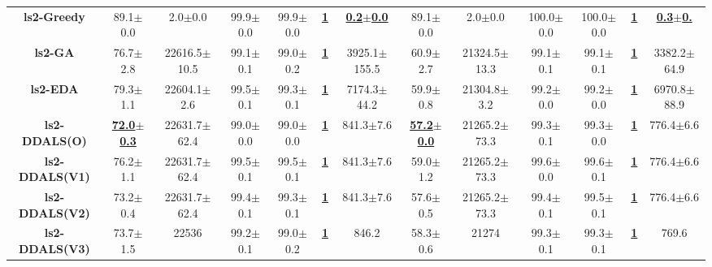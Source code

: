 \documentclass[lettersize,journal]{IEEEtran}
\begin{document}
\begin{table}[!t]
{\begin{tabular}{ccccccccccccc}
        \midrule
        {\bfseries ls2-Greedy} &89.1$\pm$0.0 &2.0$\pm$0.0 & 99.9$\pm$0.0 &99.9$\pm$0.0 &\underline{\bfseries 1} &\underline{\bfseries 0.2$\pm$0.0} &89.1$\pm$0.0 &2.0$\pm$0.0& 100.0$\pm$0.0&100.0$\pm$0.0  &\underline{\bfseries 1} &\underline{\bfseries 0.3$\pm$0.} \\
        {\bfseries ls2-GA} &76.7$\pm$2.8&22616.5$\pm$10.5 & 99.1$\pm$0.1 &99.0$\pm$0.2 &\underline{\bfseries 1} &3925.1$\pm$155.5 &60.9$\pm$2.7 &21324.5$\pm$13.3& 99.1$\pm$0.1&99.1$\pm$0.1  &\underline{\bfseries 1} &3382.2$\pm$64.9 \\
        {\bfseries ls2-EDA} &79.3$\pm$1.1 &22604.1$\pm$2.6 & 99.5$\pm$0.1 &99.3$\pm$0.1 &\underline{\bfseries 1} &7174.3$\pm$44.2 &59.9$\pm$0.8 &21304.8$\pm$3.2 & 99.2$\pm$0.0 &99.2$\pm$0.0 &\underline{\bfseries 1} &6970.8$\pm$88.9 \\
        {\bfseries ls2-DDALS(O)} &\underline{\bfseries 72.0$\pm$0.3} &22631.7$\pm$62.4 & 99.0$\pm$0.0 &99.0$\pm$0.0 &\underline{\bfseries 1} &841.3$\pm$7.6 &\underline{\bfseries 57.2$\pm$0.0} &21265.2$\pm$73.3 & 99.3$\pm$0.1 &99.3$\pm$0.0  &\underline{\bfseries 1} &776.4$\pm$6.6 \\
        {\bfseries ls2-DDALS(V1)} &76.2$\pm$1.1 &22631.7$\pm$62.4 & 99.5$\pm$0.1 &99.5$\pm$0.1 &\underline{\bfseries 1} &841.3$\pm$7.6 &59.0$\pm$1.2 &21265.2$\pm$73.3 & 99.6$\pm$0.0 &99.6$\pm$0.1  &\underline{\bfseries 1} &776.4$\pm$6.6 \\
        {\bfseries ls2-DDALS(V2)} &73.2$\pm$0.4 &22631.7$\pm$62.4 & 99.4$\pm$0.1 &99.3$\pm$0.1 &\underline{\bfseries 1} &841.3$\pm$7.6 &57.6$\pm$0.5 &21265.2$\pm$73.3 & 99.4$\pm$0.1 &99.5$\pm$0.1  &\underline{\bfseries 1} &776.4$\pm$6.6 \\
        {\bfseries ls2-DDALS(V3)} &73.7$\pm$1.5 &22536 & 99.2$\pm$0.1 &99.0$\pm$0.2 &\underline{\bfseries 1} &846.2 &58.3$\pm$0.6 &21274 & 99.3$\pm$0.1 &99.3$\pm$0.1 &\underline{\bfseries 1} &769.6 \\
        

\end{tabular}}
\end{table}
\end{document}

